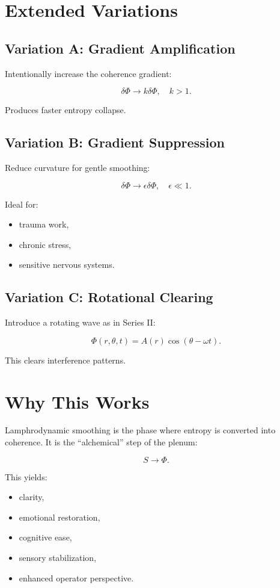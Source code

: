 \documentclass[12pt]{article}
\begin{document}
\section{Extended Variations}

\subsection{Variation A: Gradient Amplification}

Intentionally increase the coherence gradient:

\[
\delta\Phi \to k\delta\Phi, \quad k > 1.
\]

Produces faster entropy collapse.

\subsection{Variation B: Gradient Suppression}

Reduce curvature for gentle smoothing:

\[
\delta\Phi \to \epsilon \delta\Phi, \quad \epsilon \ll 1.
\]

Ideal for:

\begin{itemize}
    \item trauma work,
    \item chronic stress,
    \item sensitive nervous systems.
\end{itemize}

\subsection{Variation C: Rotational Clearing}

Introduce a rotating wave as in Series II:

\[
\Phi(r,\theta,t) = A(r)\cos(\theta - \omega t).
\]

This clears interference patterns.

\section{Why This Works}

Lamphrodynamic smoothing is the phase where entropy is converted into coherence.
It is the ``alchemical'' step of the plenum:

\[
S \to \Phi.
\]

This yields:

\begin{itemize}
    \item clarity,
    \item emotional restoration,
    \item cognitive ease,
    \item sensory stabilization,
    \item enhanced operator perspective.
\end{itemize}
\end{document}
